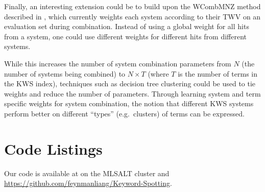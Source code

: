 \documentclass[a4paper,oneside,reqno]{amsart}
\begin{document}
Finally, an interesting extension could be to build upon the WCombMNZ method
described in \cite{mamou2013system}, which currently weights each system
according to their TWV on an evaluation set during combination. Instead of
using a global weight for all hits from a system, one could use different
weights for different hits from different systems. 

While this increases the number of system combination parameters from $N$ (the
number of systems being combined) to $N \times T$ (where $T$ is the number of
terms in the KWS index), techniques such as decision tree clustering could be
used to tie weights and reduce the number of parameters. Through learning
system and term specific weights for system combination, the notion
that different KWS systems perform better on different ``types'' (e.g.\
clusters) of terms can be expressed.


\nocite{*}


\appendix

\section{Code Listings}

Our code is available at  on the MLSALT cluster
and \url{https://github.com/feynmanliang/Keyword-Spotting}.


\end{document}
